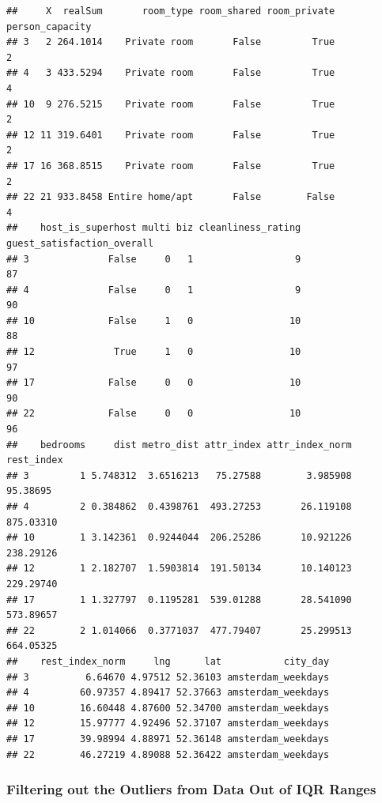 \documentclass[
]{article}
\begin{document}
\begin{verbatim}
##     X  realSum       room_type room_shared room_private person_capacity
## 3   2 264.1014    Private room       False         True               2
## 4   3 433.5294    Private room       False         True               4
## 10  9 276.5215    Private room       False         True               2
## 12 11 319.6401    Private room       False         True               2
## 17 16 368.8515    Private room       False         True               2
## 22 21 933.8458 Entire home/apt       False        False               4
##    host_is_superhost multi biz cleanliness_rating guest_satisfaction_overall
## 3              False     0   1                  9                         87
## 4              False     0   1                  9                         90
## 10             False     1   0                 10                         88
## 12              True     1   0                 10                         97
## 17             False     0   0                 10                         90
## 22             False     0   0                 10                         96
##    bedrooms     dist metro_dist attr_index attr_index_norm rest_index
## 3         1 5.748312  3.6516213   75.27588        3.985908   95.38695
## 4         2 0.384862  0.4398761  493.27253       26.119108  875.03310
## 10        1 3.142361  0.9244044  206.25286       10.921226  238.29126
## 12        1 2.182707  1.5903814  191.50134       10.140123  229.29740
## 17        1 1.327797  0.1195281  539.01288       28.541090  573.89657
## 22        2 1.014066  0.3771037  477.79407       25.299513  664.05325
##    rest_index_norm     lng      lat           city_day
## 3          6.64670 4.97512 52.36103 amsterdam_weekdays
## 4         60.97357 4.89417 52.37663 amsterdam_weekdays
## 10        16.60448 4.87600 52.34700 amsterdam_weekdays
## 12        15.97777 4.92496 52.37107 amsterdam_weekdays
## 17        39.98994 4.88971 52.36148 amsterdam_weekdays
## 22        46.27219 4.89088 52.36422 amsterdam_weekdays
\end{verbatim}

\hypertarget{filtering-out-the-outliers-from-data-out-of-iqr-ranges}{%
\subsubsection{Filtering out the Outliers from Data Out of IQR
Ranges}\label{filtering-out-the-outliers-from-data-out-of-iqr-ranges}}
\end{document}

